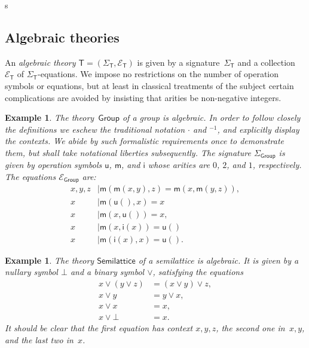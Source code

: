 s\documentclass{amsart}
\newcommand{\theory}[1]{\mathsf{#1}} %
\newcommand{\signature}[1]{\Sigma_{\theory{#1}}} %
\newcommand{\equations}[1]{\mathcal{E}_{\theory{#1}}} %
\newtheorem{example}[definition]{Example}
\begin{document}
\subsection{Algebraic theories}
\label{sec:algebraic-theories-1}

An \emph{algebraic theory $\theory{T} = (\signature{T}, \equations{T})$} is given by a
signature~$\signature{T}$ and a collection $\equations{T}$ of $\signature{T}$-equations.
%
We impose no restrictions on the number of operation symbols or equations, but at least in
classical treatments of the subject certain complications are avoided by insisting that
arities be non-negative integers.

\begin{example}
  \label{ex:theory-group}
  The theory~$\theory{Group}$ of a group is algebraic. In order to follow closely the
  definitions we eschew the traditional notation $\cdot$ and ${}^{-1}$, and explicitly
  display the contexts. We abide by such formalistic requirements once to demonstrate
  them, but shall take notational liberties subsequently.
  The signature $\signature{Group}$ is given by operation symbols $\mathsf{u}$,
  $\mathsf{m}$, and $\mathsf{i}$ whose arities are $0$, $2$, and $1$, respectively. The
  equations $\equations{Group}$ are:
  \begin{align*}
    x, y, z &\mid \mathsf{m}(\mathsf{m}(x, y), z) = \mathsf{m}(x, \mathsf{m}(y, z)),\\
    x &\mid \mathsf{m}(\mathsf{u}(), x) = x \\
    x &\mid \mathsf{m}(x, \mathsf{u}()) = x,\\
    x &\mid \mathsf{m}(x, \mathsf{i}(x)) = \mathsf{u}()\\
    x &\mid \mathsf{m}(\mathsf{i}(x), x) = \mathsf{u}().
  \end{align*}
\end{example}

\begin{example}
  \label{ex:semi-lattice}
  The theory $\theory{Semilattice}$ of a semilattice is algebraic. It is given by a
  nullary symbol $\bot$ and a binary symbol $\vee$, satisfying the equations
  \begin{align*}
    x \vee (y \vee z) &= (x \vee y) \vee z,\\
    x \vee y &= y \vee x,\\
    x \vee x &= x,\\
    x \vee \bot &= x.
  \end{align*}
  It should be clear that the first equation has context $x, y, z$, the second one
  in~$x, y$, and the last two in~$x$.
\end{example}
\end{document}
